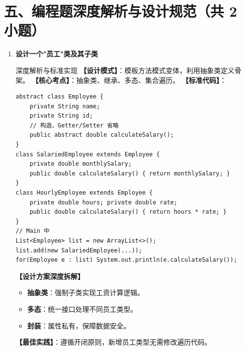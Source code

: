 \documentclass[12pt, a4paper]{ctexart}
\begin{document}
\section*{五、编程题深度解析与设计规范（共 2 小题）}

\begin{enumerate}[label=\textbf{\arabic*.}, itemsep=1em]
    \item \textbf{设计一个"员工"类及其子类}
    \begin{bluebox}{深度解析与标准实现}
    \textbf{【设计模式】}：模板方法模式变体，利用抽象类定义骨架。
    \textbf{【核心考点】}：抽象类、继承、多态、集合遍历。
    \textbf{【标准代码】}：
    \begin{lstlisting}[style=JavaExam]
abstract class Employee {
    private String name;
    private String id;
    // 构造、Getter/Setter 省略
    public abstract double calculateSalary();
}
class SalariedEmployee extends Employee {
    private double monthlySalary;
    public double calculateSalary() { return monthlySalary; }
}
class HourlyEmployee extends Employee {
    private double hours; private double rate;
    public double calculateSalary() { return hours * rate; }
}
// Main 中
List<Employee> list = new ArrayList<>();
list.add(new SalariedEmployee(...));
for(Employee e : list) System.out.println(e.calculateSalary());
    \end{lstlisting}
    \textbf{【设计方案深度拆解】}
    \begin{itemize}[leftmargin=*, nosep]
        \item \textbf{抽象类}：强制子类实现工资计算逻辑。
        \item \textbf{多态}：统一接口处理不同员工类型。
        \item \textbf{封装}：属性私有，保障数据安全。
    \end{itemize}
    \textbf{【最佳实践】}：遵循开闭原则，新增员工类型无需修改遍历代码。
    \end{bluebox}


\end{enumerate}
\end{document}
